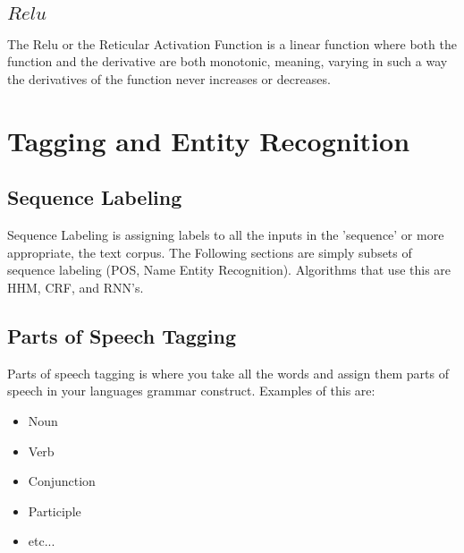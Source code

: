 \documentclass{article}
\begin{document}
\subsection{\(Relu\)}
The Relu or the Reticular Activation Function is a linear function where both the function and the derivative are both monotonic, meaning, varying in such a way the derivatives of the function never increases or decreases.
\section{Tagging and Entity Recognition} 
\subsection{Sequence Labeling}
Sequence Labeling is assigning labels to all the inputs in the 'sequence' or more appropriate, the text corpus.
The Following sections are simply subsets of sequence labeling (POS, Name Entity Recognition). 
Algorithms that use this are HHM, CRF, and RNN's. 
\subsection{Parts of Speech Tagging}
Parts of speech tagging is where you take all the words and assign them parts of speech in your languages grammar construct. 
Examples of this are: 
\begin{itemize}
	\item Noun
	\item Verb
	\item Conjunction
	\item Participle 
	\item etc...
\end{itemize}
\end{document}
